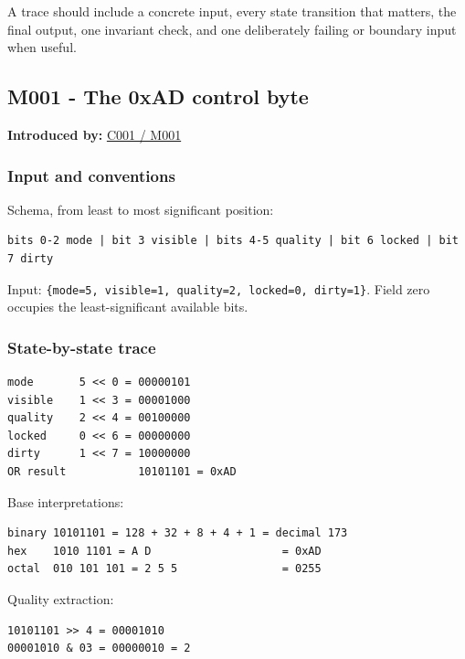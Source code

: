A trace should include a concrete input, every state transition that matters, the final output, one invariant check, and one deliberately failing or boundary input when useful.

\subsection{M001 - The 0xAD control byte}\label{appendix-92ff77d4dfdc-m001---the-0xad-control-byte}

\textbf{Introduced by:} \hyperref[01-foundations-i-ch001-from-a-signal-to-an-interpretation]{C001 / M001}

\subsubsection{Input and conventions}\label{appendix-92ff77d4dfdc-input-and-conventions}

Schema, from least to most significant position:

\begin{verbatim}
bits 0-2 mode | bit 3 visible | bits 4-5 quality | bit 6 locked | bit 7 dirty
\end{verbatim}

Input: \texttt{\{mode=5,\ visible=1,\ quality=2,\ locked=0,\ dirty=1\}}. Field zero occupies the least-significant available bits.

\subsubsection{State-by-state trace}\label{appendix-92ff77d4dfdc-state-by-state-trace}

\begin{verbatim}
mode       5 << 0 = 00000101
visible    1 << 3 = 00001000
quality    2 << 4 = 00100000
locked     0 << 6 = 00000000
dirty      1 << 7 = 10000000
OR result           10101101 = 0xAD
\end{verbatim}

Base interpretations:

\begin{verbatim}
binary 10101101 = 128 + 32 + 8 + 4 + 1 = decimal 173
hex    1010 1101 = A D                    = 0xAD
octal  010 101 101 = 2 5 5                = 0255
\end{verbatim}

Quality extraction:

\begin{verbatim}
10101101 >> 4 = 00001010
00001010 & 03 = 00000010 = 2
\end{verbatim}

